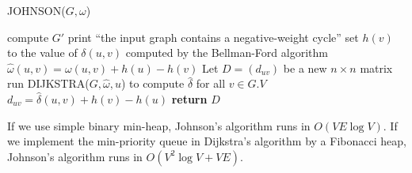 \documentclass[12pt]{article}
\begin{document}
JOHNSON($G, \omega$)
\begin{algorithmic} [1]
\State compute $G'$
	\State print ``the input graph contains a negative-weight cycle''
\Else
		\State set $h(v)$ to the value of $\delta(u,v)$ computed by the Bellman-Ford algorithm
        \EndFor
		\State $\hat{\omega}(u,v) = \omega(u,v) + h(u) - h(v)$
        \EndFor
        \State Let $D = (d_{uv})$ be a new $n \times n$ matrix
		\State run DIJKSTRA($G, \hat{\omega}, u$) to compute $\hat{\delta}$ for all $v \in G.V$
			\State $d_{uv} = \hat{\delta}(u,v) + h(v) - h(u)$
                \EndFor
        \EndFor
        \State \textbf{return } $D$
\EndIf
\end{algorithmic}

If we use simple binary min-heap, Johnson's algorithm runs in $O(VE \log V)$. If we implement the min-priority queue in Dijkstra's algorithm by a Fibonacci heap, Johnson's algorithm runs in $O(V^2 \log V + VE)$.
\end{document}
